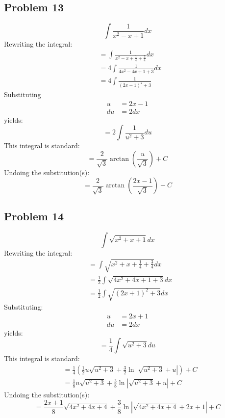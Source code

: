 \documentclass{article}
\begin{document}
\subsection*{Problem 13}
$$\int\frac{1}{x^2-x+1}dx$$
Rewriting the integral:
\begin{align*}
&=\int\frac{1}{x^2-x+\frac{1}{4}+\frac{3}{4}}dx \\
&=4\int\frac{1}{4x^2-4x+1+3}dx \\
&=4\int\frac{1}{(2x-1)^2+3}
\end{align*}
Substituting
\begin{align*}
u&=2x-1 \\
du&=2dx
\end{align*}
yields:
$$=2\int\frac{1}{u^2+3}du$$
This integral is standard:
$$=\frac{2}{\sqrt{3}}\arctan\left(\frac{u}{\sqrt{3}}\right)+C$$
Undoing the substitution(s):
$$=\frac{2}{\sqrt{3}}\arctan\left(\frac{2x-1}{\sqrt{3}}\right)+C$$
\subsection*{Problem 14}
$$\int\sqrt{x^2+x+1}dx$$
Rewriting the integral:
\begin{align*}
&=\int\sqrt{x^2+x+\frac{1}{4}+\frac{3}{4}}dx \\
&=\frac{1}{2}\int\sqrt{4x^2+4x+1+3}dx \\
&=\frac{1}{2}\int\sqrt{(2x+1)^2+3}dx
\end{align*}
Substituting:
\begin{align*}
u&=2x+1 \\
du&=2dx
\end{align*}
yields:
$$=\frac{1}{4}\int\sqrt{u^2+3}du$$
This integral is standard:
\begin{align*}
&=\frac{1}{4}\left(\frac{1}{2}u\sqrt{u^2+3}+\frac{3}{2}\ln\left|\sqrt{u^2+3}+u\right|\right)+C \\
&=\frac{1}{8}u\sqrt{u^2+3}+\frac{3}{8}\ln\left|\sqrt{u^2+3}+u\right|+C
\end{align*}
Undoing the substitution(s):
$$=\frac{2x+1}{8}\sqrt{4x^2+4x+4}+\frac{3}{8}\ln\left|\sqrt{4x^2+4x+4}+2x+1\right|+C$$
\end{document}
